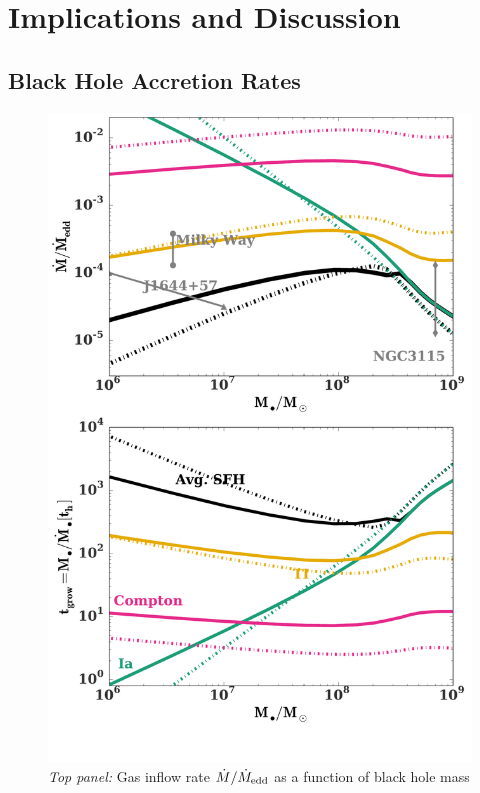 \documentclass[usenatbib,fleqn]{mn2e}
\begin{document}
\section{Implications and Discussion}
\label{sec:discussion}

\subsection{Black Hole Accretion Rates}
\label{sec:mdot}



\begin{figure}
\includegraphics[width=\columnwidth]{mdot_sfr.pdf}
\caption{\label{fig:bh_growth} {\it Top panel:} Gas inflow rate
  $\dot{M}/\dot{M}_{\rm edd}$ as a function of black hole mass
}
\end{figure}
\end{document}
